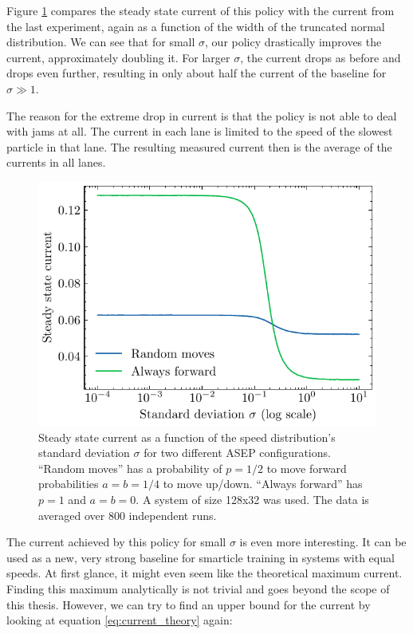 Figure \ref{fig:steady_state_current_always_forward} compares the steady state current of this policy with the current from the last experiment, again as a function of the width of the truncated normal distribution. We can see that for small $\sigma$, our policy drastically improves the current, approximately doubling it. For larger $\sigma$, the current drops as before and drops even further, resulting in only about half the current of the baseline for $\sigma\gg 1$. 


The reason for the extreme drop in current is that the policy is not able to deal with jams at all. The current in each lane is limited to the speed of the slowest particle in that lane. The resulting measured current then is the average of the currents in all lanes. 

\begin{figure}[H]
    \centering
    \includegraphics{steady_state_current_both_log.pdf}
    \caption{Steady state current as a function of the speed distribution's standard deviation $\sigma$ for two different ASEP configurations. \enquote{Random moves} has a probability of $p=1/2$ to move forward probabilities $a=b=1/4$ to move up/down. \enquote{Always forward} has $p=1$ and $a=b=0$. A system of size 128x32 was used. The data is averaged over 800 independent runs.}
    \label{fig:steady_state_current_always_forward}
\end{figure}
The current achieved by this policy for small $\sigma$ is even more interesting. It can be used as a new, very strong baseline for smarticle training in systems with equal speeds. At first glance, it might even seem like the theoretical maximum current. Finding this maximum analytically is not trivial and goes beyond the scope of this thesis. However, we can try to find an upper bound for the current by looking at equation \ref{eq:current_theory} again:
